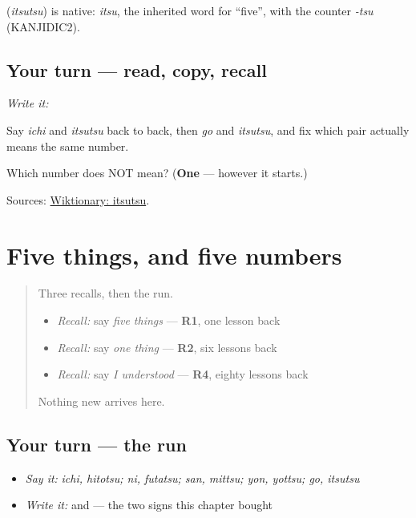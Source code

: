\begin{cousinweb}
\textbf{} (\emph{itsutsu}) is native: \emph{itsu}, the inherited word for \textquotedblleft{}five\textquotedblright{}, with the counter \emph{-tsu} (KANJIDIC2).
\end{cousinweb}

\subsection*{Your turn — read, copy, recall}
\emph{Write it:} \textbf{}

Say \emph{ichi} and \emph{itsutsu} back to back, then \emph{go} and \emph{itsutsu}, and fix which pair actually means the same number.

\begin{tcolorbox}[breakable,colback=teal!4,colframe=teal!35!black,title={Before you move on}]
Which number does \textbf{} NOT mean? (\textbf{One} — however it starts.)

Sources: \href{https://en.wiktionary.org/wiki/\%E4\%BA\%94\%E3\%81\%A4}{Wiktionary: itsutsu}.
\end{tcolorbox}
\section[Practice]{Five things, and five numbers}

\label{lesson:JA-R16-first-five-things}



\begin{quote}
Three recalls, then the run.

\begin{itemize}
\raggedright
  \item \emph{Recall:} say \emph{five things} — \textbf{R1}, one lesson back
  \item \emph{Recall:} say \emph{one thing} — \textbf{R2}, six lessons back
  \item \emph{Recall:} say \emph{I understood} — \textbf{R4}, eighty lessons back
\end{itemize}

Nothing new arrives here.
\end{quote}

\subsection*{Your turn — the run}
\begin{itemize}
\raggedright
  \item \emph{Say it:} \emph{ichi, hitotsu; ni, futatsu; san, mittsu; yon, yottsu; go, itsutsu}
  \item \emph{Write it:} \textbf{} and \textbf{} — the two signs this chapter bought
\end{itemize}

